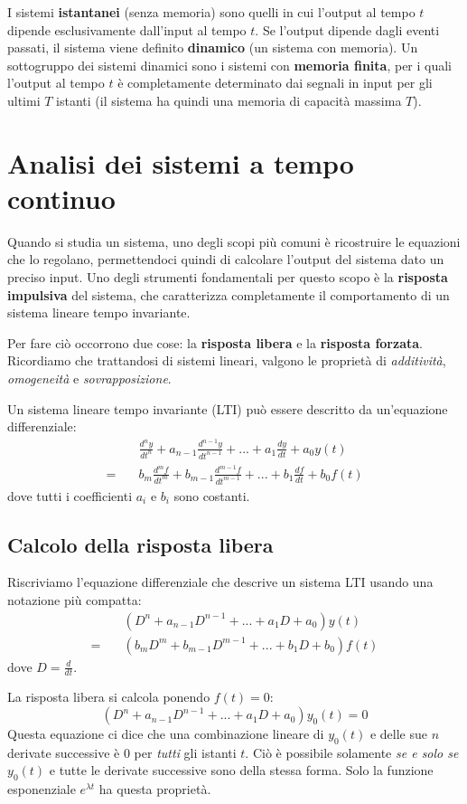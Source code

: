 \documentclass[a4paper, titlepage]{article}
\begin{document}
I sistemi \textbf{istantanei} (senza memoria) sono quelli in cui l'output al tempo $t$ dipende esclusivamente dall'input al tempo $t$.
Se l'output dipende dagli eventi passati, il sistema viene definito \textbf{dinamico} (un sistema con memoria).
Un sottogruppo dei sistemi dinamici sono i sistemi con \textbf{memoria finita}, per i quali l'output al tempo $t$ è completamente determinato
dai segnali in input per gli ultimi $T$ istanti (il sistema ha quindi una memoria di capacità massima $T$).

\section{Analisi dei sistemi a tempo continuo}
Quando si studia un sistema, uno degli scopi più comuni è ricostruire le equazioni che lo regolano, permettendoci quindi di calcolare l'output del sistema dato un preciso input.
Uno degli strumenti fondamentali per questo scopo è la \textbf{risposta impulsiva} del sistema, che caratterizza completamente il comportamento di un sistema lineare tempo invariante.

Per fare ciò occorrono due cose: la \textbf{risposta libera} e la \textbf{risposta forzata}.
Ricordiamo che trattandosi di sistemi lineari, valgono le proprietà di \textit{additività}, \textit{omogeneità} e \textit{sovrapposizione}.

Un sistema lineare tempo invariante (LTI) può essere descritto da un'equazione differenziale:
\begin{align*}
&\frac{d^ny}{dt^n}+a_{n-1}\frac{d^{n-1}y}{dt^{n-1}}+...+a_{1}\frac{dy}{dt}+a_{0}y(t)\\
=\quad &b_{m}\frac{d^mf}{dt^m}+b_{m-1}\frac{d^{m-1}f}{dt^{m-1}}+...+b_{1}\frac{df}{dt}+b_{0}f(t)
\end{align*}
dove tutti i coefficienti $a_{i}$ e $b_{i}$ sono costanti.

\subsection{Calcolo della risposta libera}
Riscriviamo l'equazione differenziale che descrive un sistema LTI usando una notazione più compatta:
\begin{align*}
&(D^n+a_{n-1}D^{n-1}+...+a_1D+a_{0})y(t)\\
=\quad &(b_mD^m+b_{m-1}D^{m-1}+...+b_1D+b_0)f(t)
\end{align*}
dove $D=\frac{d}{dt}.$

La risposta libera si calcola ponendo $f(t)=0$:
$$ (D^n+a_{n-1}D^{n-1}+...+a_1D+a_{0})y_0(t)=0 $$
Questa equazione ci dice che una combinazione lineare di $y_0(t)$ e delle sue $n$ derivate successive
è $0$ per \textit{tutti} gli istanti $t$. Ciò è possibile solamente \textit{se e solo se} $y_0(t)$ e tutte
le derivate successive sono della stessa forma. Solo la funzione esponenziale $e^{\lambda t}$ ha questa proprietà.
\end{document}

